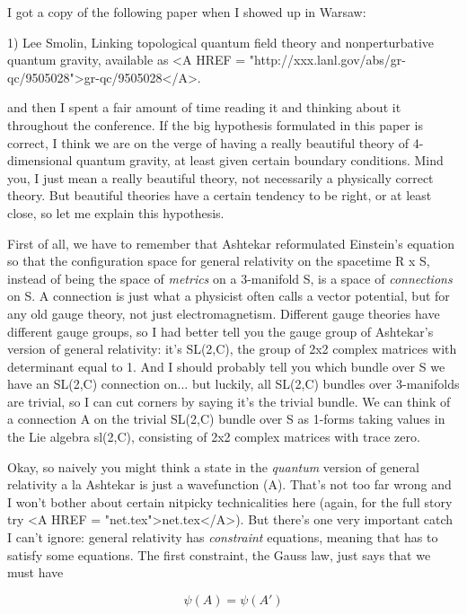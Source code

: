 

I got a copy of the following paper when I showed up in Warsaw:

1) Lee Smolin, Linking topological quantum field theory and 
nonperturbative quantum gravity, available as <A HREF = "http://xxx.lanl.gov/abs/gr-qc/9505028">gr-qc/9505028</A>.

and then I spent a fair amount of time reading it and thinking
about it throughout the conference.  If the big hypothesis formulated in
this paper is correct, I think we are on the verge of having a
really beautiful theory of 4-dimensional quantum gravity, at
least given certain boundary conditions.  Mind you, I just
mean a really beautiful theory, not necessarily a physically
correct theory.  But beautiful theories have a certain tendency
to be right, or at least close, so let me explain this hypothesis. 

First of all, we have to remember that Ashtekar reformulated
Einstein's equation so that the configuration space for general 
relativity on the spacetime R x S, instead of being the space
of \emph{metrics} on a 3-manifold S, is a space of \emph{connections} on S.  
A connection is just what a physicist often calls a vector potential, but
for any old gauge theory, not just electromagnetism.  Different gauge
theories have different gauge groups, so I had better tell you the
gauge group of Ashtekar's version of general relativity: it's SL(2,C), 
the group of 2x2 complex matrices with determinant equal to 1. 
And I should probably tell you which bundle over S we have an SL(2,C)
connection on... but luckily, all SL(2,C) bundles over 3-manifolds
are trivial, so I can cut corners by saying it's the trivial bundle. 
We can think of a connection A
on the trivial SL(2,C) bundle over S as 1-forms taking values in
the Lie algebra sl(2,C), consisting of 2x2 complex matrices with
trace zero.

Okay, so naively you might think a state in the \emph{quantum} version
of general relativity a la Ashtekar is just a wavefunction \psi (A).
That's not too far wrong and I won't bother about certain nitpicky
technicalities here (again, for the full story try 
<A HREF = "net.tex">net.tex</A>).  But there's
one very important catch I can't ignore: general relativity has 
\emph{constraint} equations, meaning that \psi  has to satisfy some 
equations.  The first constraint, the Gauss law, just says that we must have


$$

                      \psi (A) = \psi (A')
$$
    

